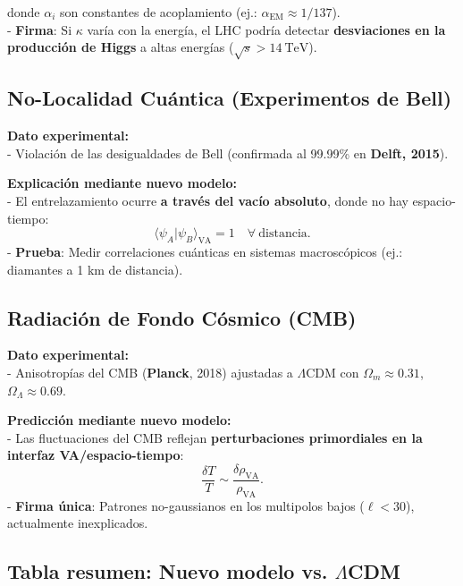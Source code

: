 \documentclass[a4paper]{article}
\theoremstyle{definition}
\theoremstyle{remark}
\numberwithin{equation}{section}
\begin{document}
	donde \( \alpha_i \) son constantes de acoplamiento (ej.: \( \alpha_{\text{EM}} \approx 1/137 \)).\\
	
	- \textbf{Firma}: Si \( \kappa \) varía con la energía, el LHC podría detectar \textbf{desviaciones en la producción de Higgs} a altas energías (\( \sqrt{s} > 14 \ \text{TeV} \)).\\
	
	\subsection{No-Localidad Cuántica (Experimentos de Bell)}
	
	\textbf{Dato experimental:} \\
	
	- Violación de las desigualdades de Bell (confirmada al 99.99\% en \textbf{Delft, 2015}).
	
	\textbf{Explicación mediante nuevo modelo:}\\
	
	- El entrelazamiento ocurre \textbf{a través del vacío absoluto}, donde no hay espacio-tiempo:
	\[
	\langle \psi_A | \psi_B \rangle_{\text{VA}} = 1 \quad \forall \ \text{distancia}.
	\]
	- \textbf{Prueba}: Medir correlaciones cuánticas en sistemas macroscópicos (ej.: diamantes a 1 km de distancia).\\
	
	\subsection{Radiación de Fondo Cósmico (CMB)}
	
	\textbf{Dato experimental:}\\
	
	- Anisotropías del CMB (\textbf{Planck}, 2018) ajustadas a \( \Lambda \)CDM con \( \Omega_m \approx 0.31 \), \( \Omega_\Lambda \approx 0.69 \).
	
	\textbf{Predicción mediante nuevo modelo:}\\
	
	- Las fluctuaciones del CMB reflejan \textbf{perturbaciones primordiales en la interfaz VA/espacio-tiempo}:
	\[
	\frac{\delta T}{T} \sim \frac{\delta \rho_{\text{VA}}}{\rho_{\text{VA}}}.
	\]
	- \textbf{Firma única}: Patrones no-gaussianos en los multipolos bajos (\( \ell < 30 \)), actualmente inexplicados.
	
	\subsection{Tabla resumen: Nuevo modelo vs. \(\Lambda\)CDM}
	
\end{document}
